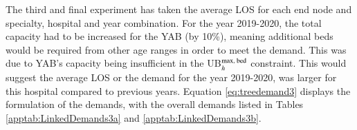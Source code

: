 \documentclass[../thesis.tex]{subfiles}
\begin{document}
\begin{table}[h!]
    \centering{}
    \caption{The EV, RP and EEV values for the $x^\textnormal{bed}$, $u^\textnormal{bed}$, $x^\textnormal{staff}$, $u^\textnormal{staff}$ decision variables and objective function using the regression tree and the yearly average LOS.}
    \label{tab:Results2}
\end{table}

The third and final experiment has taken the average LOS for each end node and specialty, hospital and year combination. For the year 2019-2020, the total capacity had to be increased for the YAB (by 10\%), meaning additional beds would be required from other age ranges in order to meet the demand. This was due to YAB's capacity being insufficient in the UB$_{h}^{\textnormal{max, bed}}$ constraint. This would suggest the average LOS or the demand for the year 2019-2020, was larger for this hospital compared to previous years. Equation \eqref{eq:treedemand3} displays the formulation of the demands, with the overall demands listed in Tables \ref{apptab:LinkedDemands3a} and \ref{apptab:LinkedDemands3b}.
\end{document}
